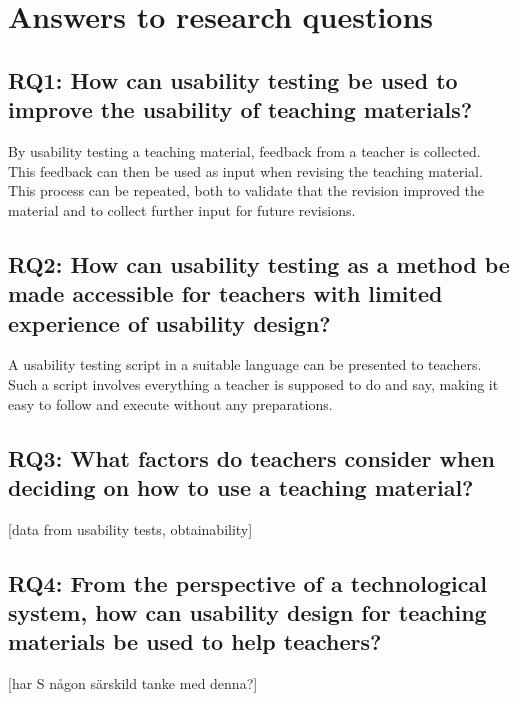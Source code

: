\section{Answers to research questions}

\subsection{RQ1: How can usability testing be used to improve the usability of teaching materials?}
By usability testing a teaching material, feedback from a teacher is collected. This feedback can then be 
used as input when revising the teaching material. This process can be repeated, both to validate that the 
revision improved the material and to collect further input for future revisions.

\subsection{RQ2: How can usability testing as a method be made accessible for teachers with limited experience of 
usability design?}
A usability testing script in a suitable language can be presented to teachers. Such a script involves 
everything a teacher is supposed to do and say, making it easy to follow and execute without any preparations.

\subsection{RQ3: What factors do teachers consider when deciding on how to use a teaching material?}
[data from usability tests, obtainability]

\subsection{RQ4: From the perspective of a technological system, how can usability design for teaching materials 
be used to help teachers?}
[har S någon särskild tanke med denna?] 